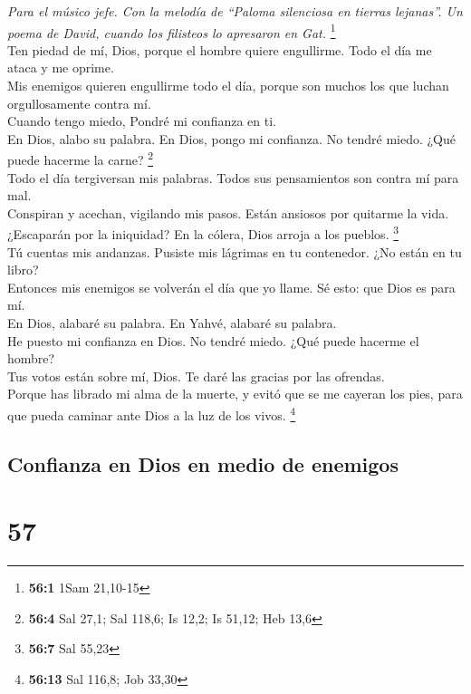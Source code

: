 \emph{Para el músico jefe. Con la melodía de ``Paloma silenciosa en
tierras lejanas''. Un poema de David, cuando los filisteos lo apresaron
en Gat.} \footnote{\textbf{56:1} 1Sam 21,10-15}\\
 Ten piedad de mí, Dios, porque el hombre quiere
engullirme. Todo el día me ataca y me oprime.\\
 Mis enemigos quieren engullirme todo el día, porque son
muchos los que luchan orgullosamente contra mí.\\
 Cuando tengo miedo, Pondré mi confianza en ti.\\
 En Dios, alabo su palabra. En Dios, pongo mi confianza.
No tendré miedo. ¿Qué puede hacerme la carne? \footnote{\textbf{56:4}
  Sal 27,1; Sal 118,6; Is 12,2; Is 51,12; Heb 13,6}\\
 Todo el día tergiversan mis palabras. Todos sus
pensamientos son contra mí para mal.\\
 Conspiran y acechan, vigilando mis pasos. Están ansiosos
por quitarme la vida.\\
 ¿Escaparán por la iniquidad? En la cólera, Dios arroja a
los pueblos. \footnote{\textbf{56:7} Sal 55,23}\\
 Tú cuentas mis andanzas. Pusiste mis lágrimas en tu
contenedor. ¿No están en tu libro?\\
 Entonces mis enemigos se volverán el día que yo llame. Sé
esto: que Dios es para mí.\\
 En Dios, alabaré su palabra. En Yahvé, alabaré su
palabra.\\
 He puesto mi confianza en Dios. No tendré miedo. ¿Qué
puede hacerme el hombre?\\
 Tus votos están sobre mí, Dios. Te daré las gracias por
las ofrendas.\\
 Porque has librado mi alma de la muerte, y evitó que se
me cayeran los pies, para que pueda caminar ante Dios a la luz de los
vivos. \footnote{\textbf{56:13} Sal 116,8; Job 33,30}

\hypertarget{confianza-en-dios-en-medio-de-enemigos}{%
\subsection{Confianza en Dios en medio de
enemigos}\label{confianza-en-dios-en-medio-de-enemigos}}

\hypertarget{section-55}{%
\section{57}\label{section-55}}

